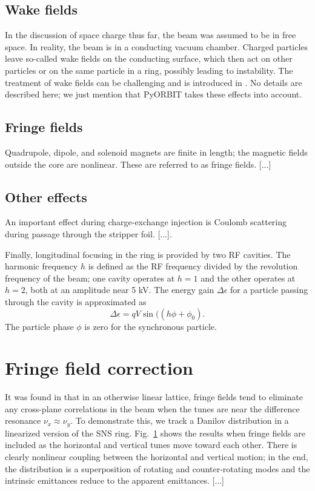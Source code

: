 \subsection{Wake fields}

In the discussion of space charge thus far, the beam was assumed to be in free space. In reality, the beam is in a conducting vacuum chamber. Charged particles leave so-called wake fields on the conducting surface, which then act on other particles or on the same particle in a ring, possibly leading to instability. The treatment of wake fields can be challenging and is introduced in \cite{Chao1993}. No details are described here; we just mention that PyORBIT takes these effects into account.


\subsection{Fringe fields}

Quadrupole, dipole, and solenoid magnets are finite in length; the magnetic fields outside the core are nonlinear. These are referred to as fringe fields. [...]


\subsection{Other effects}

An important effect during charge-exchange injection is Coulomb scattering during passage through the stripper foil. [...].

Finally, longitudinal focusing in the ring is provided by two RF cavities. The harmonic frequency $h$ is defined as the RF frequency divided by the revolution frequency of the beam; one cavity operates at $h = 1$ and the other operates at $h = 2$, both at an amplitude near 5 kV. The energy gain $\Delta \epsilon$ for a particle passing through the cavity is approximated as  
%
\begin{equation}
    \Delta \epsilon = q V \sin((h \phi + \phi_0).
\end{equation}
%
The particle phase $\phi$ is zero for the synchronous particle.



\section{Fringe field correction}

It was found in \cite{Holmes2018} that in an otherwise linear lattice, fringe fields tend to eliminate any cross-plane correlations in the beam when the tunes are near the difference resonance $\nu_x \approx \nu_y$. To demonstrate this, we track a Danilov distribution in a linearized version of the SNS ring. Fig.~\ref{} shows the results when fringe fields are included as the horizontal and vertical tunes move toward each other. There is clearly nonlinear coupling between the horizontal and vertical motion; in the end, the distribution is a superposition of rotating and counter-rotating modes and the intrinsic emittances reduce to the apparent emittances. [...]

